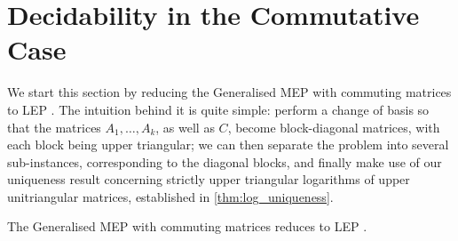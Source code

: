 \section{Decidability in the Commutative Case}
\label{sec:lics_decidability}

We start this section by reducing the Generalised MEP with commuting
matrices to LEP \@. The intuition behind it is quite simple: perform a
change of basis so that the matrices $A_{1}, \ldots, A_{k}$, as well
as $C$, become block-diagonal matrices, with each block being upper
triangular; we can then separate the problem into several
sub-instances, corresponding to the diagonal blocks, and finally make
use of our uniqueness result concerning strictly upper triangular
logarithms of upper unitriangular matrices, established in \cref{thm:log_uniqueness}.

\begin{theorem}
The Generalised MEP with commuting matrices reduces to LEP \@.
\end{theorem}

